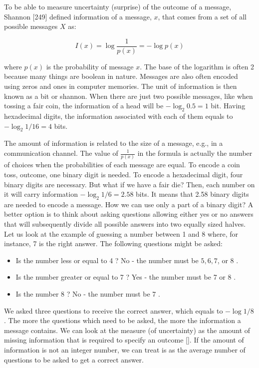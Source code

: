 To be able to measure uncertainty (surprise) of the outcome of a message, Shannon [249] defined information of a message, $x$, that comes from a set of all possible messages $X$ as:


\begin{equation*}
I(x)=\log \frac{1}{p(x)}=-\log p(x) \tag{14.5}
\end{equation*}


where $p(x)$ is the probability of message $x$. The base of the logarithm is often 2 because many things are boolean in nature. Messages are also often encoded using zeros and ones in computer memories. The unit of information is then known as a bit or shannon. When there are just two possible messages, like when tossing a fair coin, the information of a head will be $-\log _{2} 0.5=1$ bit. Having hexadecimal digits, the information associated with each of them equals to $-\log _{2} 1 / 16=4$ bits.

The amount of information is related to the size of a message, e.g., in a communication channel. The value of $\frac{1}{p(x)}$ in the formula is actually the number of choices when the probabilities of each message are equal. To encode a coin toss, outcome, one binary digit is needed. To encode a hexadecimal digit, four binary digits are necessary. But what if we have a fair die? Then, each number on it will carry information $-\log _{2} 1 / 6=2.58$ bits. It means that 2.58 binary digits are needed to encode a message. How we can use only a part of a binary digit? A better option is to think about asking questions allowing either yes or no answers that will subsequently divide all possible answers into two equally sized halves. Let us look at the example of guessing a number between 1 and 8 where, for instance, 7 is the right answer. The following questions might be asked:

\begin{itemize}
  \item Is the number less or equal to 4 ? No - the number must be $5,6,7$, or 8 .
  \item Is the number greater or equal to 7 ? Yes - the number must be 7 or 8 .
  \item Is the number 8 ? No - the number must be 7 .
\end{itemize}

We asked three questions to receive the correct answer, which equals to $-\log 1 / 8$. The more the questions which need to be asked, the more the information a message contains. We can look at the measure (of uncertainty) as the amount of missing information that is required to specify an outcome [\cite{ref164}]. If the amount of information is not an integer number, we can treat is as the average number of questions to be asked to get a correct answer.

